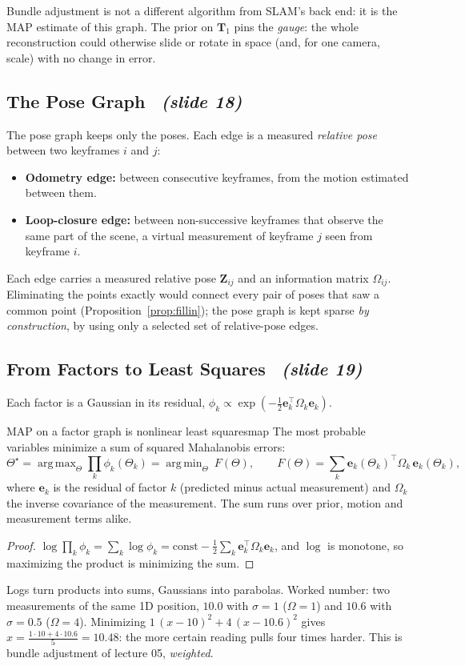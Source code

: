 \documentclass[11pt,a4paper]{article}
\newcommand{\slrs}[1]{\texorpdfstring{\ \emph{(slide #1)}}{ (slide #1)}}
\newcommand{\be}{\mathbf{e}}
\newcommand{\bT}{\mathbf{T}}
\DeclareMathOperator*{\argmin}{arg\,min}
\DeclareMathOperator*{\argmax}{arg\,max}
\begin{document}
\begin{intuition}
Bundle adjustment is not a different algorithm from SLAM's back end: it is the MAP estimate of this graph. The prior on $\bT_1$ pins the \emph{gauge}: the whole reconstruction could otherwise slide or rotate in space (and, for one camera, scale) with no change in error.
\end{intuition}

\subsection{The Pose Graph \slrs{18}}
The pose graph keeps only the poses. Each edge is a measured \emph{relative pose} between two keyframes $i$ and $j$:
\begin{itemize}[nosep]
\item \textbf{Odometry edge:} between consecutive keyframes, from the motion estimated between them.
\item \textbf{Loop-closure edge:} between non-successive keyframes that observe the same part of the scene, a virtual measurement of keyframe $j$ seen from keyframe $i$.
\end{itemize}
Each edge carries a measured relative pose $\mathbf Z_{ij}$ and an information matrix $\Omega_{ij}$. Eliminating the points exactly would connect every pair of poses that saw a common point (Proposition~\ref{prop:fillin}); the pose graph is kept sparse \emph{by construction}, by using only a selected set of relative-pose edges.

\subsection{From Factors to Least Squares \slrs{19}}
Each factor is a Gaussian in its residual, $\phi_k\propto\exp(-\frac12\be_k^\top\Omega_k\be_k)$.

\begin{theorem}{MAP on a factor graph is nonlinear least squares}{map}
The most probable variables minimize a sum of squared Mahalanobis errors:
\[
\Theta^\star=\argmax_\Theta\prod_k\phi_k(\Theta_k)=\argmin_\Theta\ F(\Theta),\qquad F(\Theta)=\sum_k\be_k(\Theta_k)^\top\Omega_k\,\be_k(\Theta_k),
\]
where $\be_k$ is the residual of factor $k$ (predicted minus actual measurement) and $\Omega_k$ the inverse covariance of the measurement. The sum runs over prior, motion and measurement terms alike.
\end{theorem}
\begin{proof}
$\log\prod_k\phi_k=\sum_k\log\phi_k=\text{const}-\tfrac12\sum_k\be_k^\top\Omega_k\be_k$, and $\log$ is monotone, so maximizing the product is minimizing the sum. \qedhere
\end{proof}
\begin{intuition}
Logs turn products into sums, Gaussians into parabolas. Worked number: two measurements of the same 1D position, $10.0$ with $\sigma=1$ ($\Omega=1$) and $10.6$ with $\sigma=0.5$ ($\Omega=4$). Minimizing $1\,(x-10)^2+4\,(x-10.6)^2$ gives $x=\frac{1\cdot10+4\cdot10.6}{5}=10.48$: the more certain reading pulls four times harder. This is bundle adjustment of lecture 05, \emph{weighted}.
\end{intuition}
\end{document}
